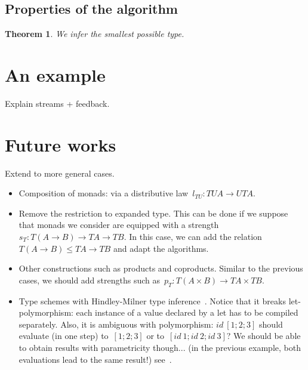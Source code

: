 \documentclass{article}
\newtheorem{theorem}{Theorem}
\theoremstyle{example}
\renewcommand{\leq}{\leqslant}
\newcommand{\cast}{\leq}
\begin{document}
\subsection{Properties of the algorithm}
\begin{theorem}
  We infer the smallest possible type.
\end{theorem}

\section{An example}
Explain streams + feedback.

\section{Future works}
Extend to more general cases.
\begin{itemize}
\item Composition of monads: via a distributive law~$l_{TU}:TUA\to UTA$.
\item Remove the restriction to expanded type. This can be done if we suppose
  that monads we consider are equipped with a strength $s_T:T(A\to B)\to TA\to
  TB$. In this case, we can add the relation~$T(A\to B)\cast TA\to TB$ and adapt
  the algorithms.
\item Other constructions such as products and coproducts. Similar to the
  previous cases, we should add strengths such as~$p_T:T(A\times B)\to TA\times
  TB$.
\item Type schemes with Hindley-Milner type
  inference~\cite{hindley1969principal, damas1982principal}. Notice that it
  breaks let-polymorphism: each instance of a value declared by a let has to be
  compiled separately. Also, it is ambiguous with polymorphism: $id\ [1;2;3]$
  should evaluate (in one step) to~$[1;2;3]$ or to~$[id\ 1;id\ 2;id\ 3]$? We
  should be able to obtain results with parametricity though... (in the previous
  example, both evaluations lead to the same result!)
  see~\cite{wadler1989theorems}.
\end{itemize}



\end{document}
